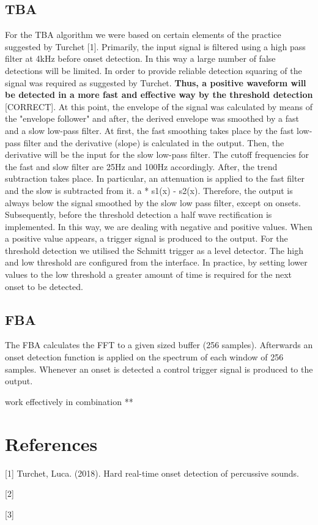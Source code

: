 \documentclass[11pt]{article}
\begin{document}
\subsection{TBA}
\label{sec:org31f4b3a}

For the TBA algorithm we were based on certain elements of the practice suggested by Turchet [1].
Primarily, the input signal is filtered using a high pass filter at 4kHz before onset detection.  In this way a large number of false detections will be limited.  In order to provide reliable detection squaring of the signal was required as suggested by Turchet.  \textbf{Thus, a positive waveform will be detected in a more fast and effective way by the threshold detection} [CORRECT].  At this point, the envelope of the signal was calculated by means of the "envelope follower" and after, the derived envelope was smoothed by a fast and a slow low-pass filter.  At first, the fast smoothing takes place by the fast low-pass filter and the derivative (slope) is calculated in the output.  Then, the derivative will be the input for the slow low-pass filter.  The cutoff frequencies for the fast and slow filter are 25Hz and 100Hz accordingly.  After, the trend subtraction takes place.  In particular, an attenuation is applied to the fast filter and the slow is subtracted from it. a * s1(x) - s2(x).  Therefore, the output is always below the signal smoothed by the slow low pass filter, except on onsets.  Subsequently, before the threshold detection a half wave rectification is implemented.  In this way, we are dealing with negative and positive values.  When a positive value appears, a trigger signal is produced to the output.  For the threshold detection we utilised the Schmitt trigger as a level detector.  The high and low threshold are configured from the interface.  In practice, by setting lower values to the low threshold a greater amount of time is required for the next onset to be detected.

\subsection{FBA}
\label{sec:org9f87070}
The FBA calculates the FFT to a given sized buffer (256 samples).  Afterwards an onset detection function is applied on the spectrum of each window of 256 samples.  Whenever an onset is detected a control trigger signal is produced to the output.



work effectively in combination
**

\section{References}
\label{sec:org162bcad}
[1] Turchet, Luca. (2018). Hard real-time onset detection of percussive sounds.

[2]

[3]
\end{document}
